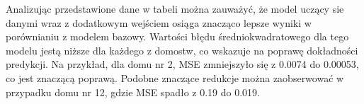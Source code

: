 \documentclass[a4paper,twoside,12pt]{book}
\begin{document}
\begin{table}[!h]
  \centering
  \caption{Porównanie wartości MSE dla dwóch modeli w kontekście poszczególnych domostw}
  \renewcommand{\arraystretch}{1.5}
\end{table}

Analizując przedstawione dane w tabeli można zauważyć, że model uczący sie danymi wraz z dodatkowym wejściem osiąga znacząco lepsze wyniki w porównianiu z modelem bazowy. Wartości błędu średniokwadratowego dla tego modelu jestą niższe dla każdego z domostw, co wskazuje na poprawę dokładności predykcji.
Na przykład, dla domu nr 2, MSE zmniejszyło się z 0.0074 do 0.00053, co jest znaczącą poprawą. Podobne znaczące redukcje można zaobserwować w przypadku domu nr 12, gdzie MSE spadło z 0.19 do 0.019.
\end{document}
